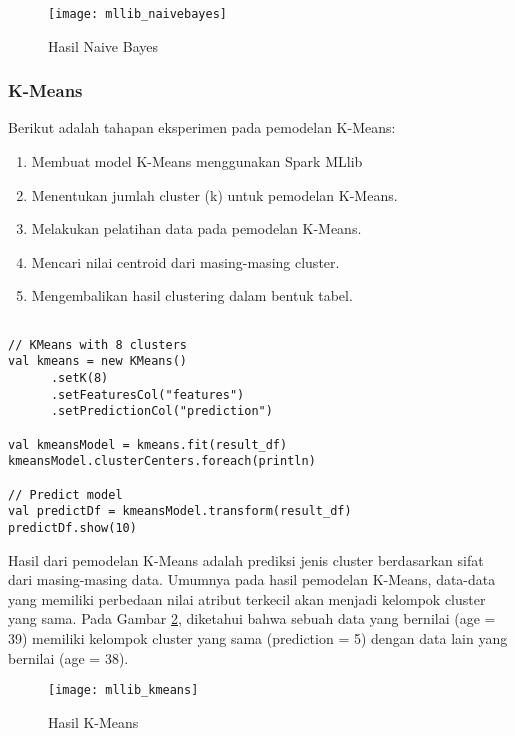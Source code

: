\begin{figure}[H]
	\centering
	\texttt{[image: mllib\_naivebayes]}
	\caption{Hasil Naive Bayes}
	\label{fig:mllib_naivebayes}
\end{figure}


\subsubsection{K-Means}
\noindent Berikut adalah tahapan eksperimen pada pemodelan K-Means:
\begin{enumerate}
\item Membuat model K-Means menggunakan Spark MLlib
\item Menentukan jumlah cluster (k) untuk pemodelan K-Means.
\item Melakukan pelatihan data pada pemodelan K-Means.
\item Mencari nilai centroid dari masing-masing cluster.
\item Mengembalikan hasil clustering dalam bentuk tabel.

\end{enumerate}	
\begin{lstlisting}[basicstyle=\ttfamily, frame=single,
	columns=fullflexible, keepspaces=true, breaklines=true, label=ls_kepatuhan_1_1_1_logo_sharif_judge, caption=Main method]
	
// KMeans with 8 clusters
val kmeans = new KMeans()
      .setK(8)
      .setFeaturesCol("features")
      .setPredictionCol("prediction")

val kmeansModel = kmeans.fit(result_df)
kmeansModel.clusterCenters.foreach(println)

// Predict model
val predictDf = kmeansModel.transform(result_df)
predictDf.show(10)

\end{lstlisting}

\newpage
\par Hasil dari pemodelan K-Means adalah prediksi jenis cluster berdasarkan sifat dari masing-masing data. Umumnya pada hasil pemodelan K-Means, data-data yang memiliki perbedaan nilai atribut terkecil akan menjadi kelompok cluster yang sama. Pada Gambar \ref{fig:mllib_kmeans}, diketahui bahwa sebuah data yang bernilai (age = 39) memiliki kelompok cluster yang sama (prediction = 5) dengan data lain yang bernilai (age = 38).

\begin{figure}[H]
	\centering
	\texttt{[image: mllib\_kmeans]}
	\caption{Hasil K-Means}
	\label{fig:mllib_kmeans}
\end{figure}


